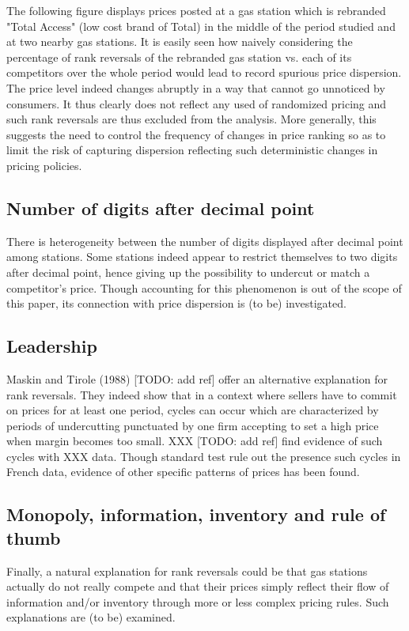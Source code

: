 \documentclass[english]{article}
\begin{document}
The following figure displays prices posted at a gas station which is rebranded "Total Access" (low cost brand of Total) in the middle of the period studied and at two nearby gas stations. It is easily seen how naively considering the percentage of rank reversals of the rebranded gas station vs. each of its competitors over the whole period would lead to record spurious price dispersion. The price level indeed changes abruptly in a way that cannot go unnoticed by consumers. It thus clearly does not reflect any used of randomized pricing and such rank reversals are thus excluded from the analysis. More generally, this suggests the need to control the frequency of changes in price ranking so as to limit the risk of capturing dispersion reflecting such deterministic changes in pricing policies.

\subsection{Number of digits after decimal point}

There is heterogeneity between the number of digits displayed after decimal point among stations. Some stations indeed appear to restrict themselves to two digits after decimal point, hence giving up the possibility to undercut or match a competitor's price. Though accounting for this phenomenon is out of the scope of this paper, its connection with price dispersion is (to be) investigated.

\subsection{Leadership}

Maskin and Tirole (1988) [TODO: add ref] offer an alternative explanation for rank reversals. They indeed show that in a context where sellers have to commit on prices for at least one period, cycles can occur which are characterized by periods of undercutting punctuated by one firm accepting to set a high price when margin becomes too small. XXX [TODO: add ref] find evidence of such cycles with XXX data. Though standard test rule out the presence such cycles in French data, evidence of other specific patterns of prices has been found.

\subsection{Monopoly, information, inventory and rule of thumb}

Finally, a natural explanation for rank reversals could be that gas stations actually do not really compete and that their prices simply reflect their flow of information and/or inventory through more or less complex pricing rules. Such explanations are (to be) examined.
\end{document}
